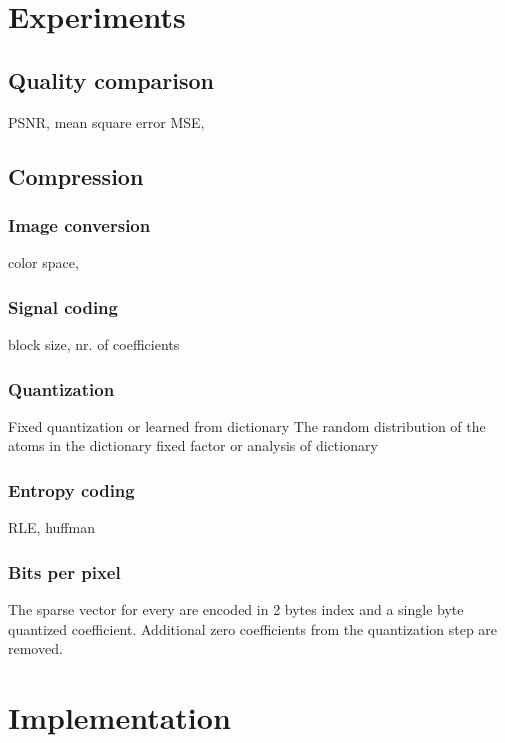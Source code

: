 \section{Experiments}
\subsection{Quality comparison}
PSNR, mean square error MSE, 



\subsection{Compression}
\subsubsection*{Image conversion}
color space, 
\subsubsection*{Signal coding}
block size, nr. of coefficients
\subsubsection*{Quantization}
Fixed quantization or learned from dictionary
The random distribution of the atoms in the dictionary 
fixed factor or analysis of dictionary
\subsubsection*{Entropy coding}
RLE, huffman
\subsubsection*{Bits per pixel}
The sparse vector for every are encoded in 2 bytes index and a single byte quantized coefficient. Additional zero coefficients from the quantization step are removed.





\section{Implementation}
%

